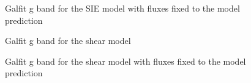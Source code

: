\documentclass[manuscript]{aastex}
\begin{document}
\begin{figure}
\caption{
Galfit g band for the SIE model with fluxes fixed to the model prediction}
\label{galfitg}
\end{figure}



\begin{figure}
\caption{
Galfit g band for the shear model}
\label{galfitgshear}
\end{figure}

\begin{figure}
\caption{
Galfit g band for the shear model with fluxes fixed to the model prediction}
\label{galfitg}
\end{figure}
\end{document}
